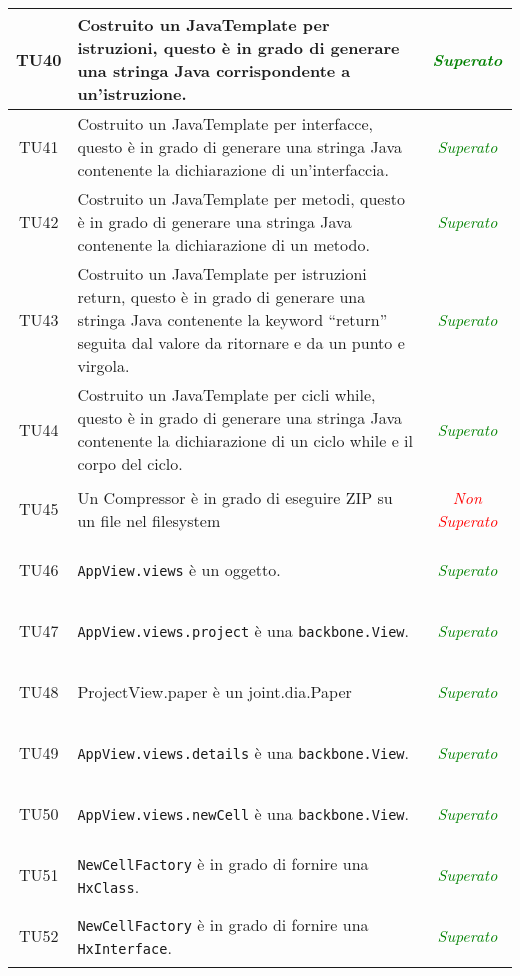 \begin{longtable}{|c|>{}m{8cm}|c|}
\hypertarget{TU40}{TU40} & Costruito un JavaTemplate per istruzioni, questo è in grado di generare una stringa Java corrispondente a un'istruzione. & \textcolor{Green}{\textit{Superato}}\\ \hline
\hypertarget{TU41}{TU41} & Costruito un JavaTemplate per interfacce, questo è in grado di generare una stringa Java contenente la dichiarazione di un'interfaccia. & \textcolor{Green}{\textit{Superato}}\\ \hline
\hypertarget{TU42}{TU42} & Costruito un JavaTemplate per metodi, questo è in grado di generare una stringa Java contenente la dichiarazione di un metodo. & \textcolor{Green}{\textit{Superato}}\\ \hline
\hypertarget{TU43}{TU43} & Costruito un JavaTemplate per istruzioni return, questo è in grado di generare una stringa Java contenente la keyword ``return'' seguita dal valore da ritornare e da un punto e virgola. & \textcolor{Green}{\textit{Superato}}\\ \hline
\hypertarget{TU44}{TU44} & Costruito un JavaTemplate per cicli while, questo è in grado di generare una stringa Java contenente la dichiarazione di un ciclo while e il corpo del ciclo. & \textcolor{Green}{\textit{Superato}}\\ \hline
\hypertarget{TU45}{TU45} & Un Compressor è in grado di eseguire ZIP su un file nel filesystem & \textcolor{Red}{\textit{Non Superato}}\\ \hline
\hypertarget{TU46}{TU46} & \texttt{AppView.views} è un oggetto. & \textcolor{Green}{\textit{Superato}}\\ \hline
\hypertarget{TU47}{TU47} & \texttt{AppView.views.project} è una \texttt{backbone.View}. & \textcolor{Green}{\textit{Superato}}\\ \hline
\hypertarget{TU48}{TU48} & ProjectView.paper è un joint.dia.Paper & \textcolor{Green}{\textit{Superato}}\\ \hline
\hypertarget{TU49}{TU49} & \texttt{AppView.views.details} è una \texttt{backbone.View}. & \textcolor{Green}{\textit{Superato}}\\ \hline
\hypertarget{TU50}{TU50} & \texttt{AppView.views.newCell} è una \texttt{backbone.View}. & \textcolor{Green}{\textit{Superato}}\\ \hline
\hypertarget{TU51}{TU51} & \texttt{NewCellFactory} è in grado di fornire una \texttt{HxClass}. & \textcolor{Green}{\textit{Superato}}\\ \hline
\hypertarget{TU52}{TU52} & \texttt{NewCellFactory} è in grado di fornire una \texttt{HxInterface}. & \textcolor{Green}{\textit{Superato}}\\ \hline

\end{longtable}
